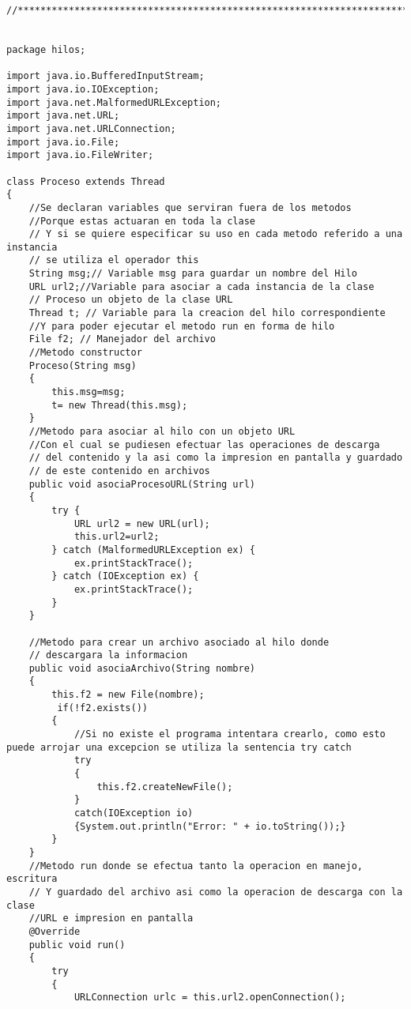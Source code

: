 \documentclass[12pt]{article} %
\begin{document}
\begin{lstlisting}
//*********************************************************************************************************//


package hilos;

import java.io.BufferedInputStream; 
import java.io.IOException;
import java.net.MalformedURLException;
import java.net.URL;
import java.net.URLConnection;
import java.io.File;
import java.io.FileWriter;

class Proceso extends Thread 
{
    //Se declaran variables que serviran fuera de los metodos
    //Porque estas actuaran en toda la clase 
    // Y si se quiere especificar su uso en cada metodo referido a una instancia
    // se utiliza el operador this
    String msg;// Variable msg para guardar un nombre del Hilo
    URL url2;//Variable para asociar a cada instancia de la clase
    // Proceso un objeto de la clase URL
    Thread t; // Variable para la creacion del hilo correspondiente
    //Y para poder ejecutar el metodo run en forma de hilo
    File f2; // Manejador del archivo
    //Metodo constructor
    Proceso(String msg)
    {
        this.msg=msg;
        t= new Thread(this.msg);
    }
    //Metodo para asociar al hilo con un objeto URL
    //Con el cual se pudiesen efectuar las operaciones de descarga
    // del contenido y la asi como la impresion en pantalla y guardado
    // de este contenido en archivos
    public void asociaProcesoURL(String url)
    {
        try {
            URL url2 = new URL(url);
            this.url2=url2;
        } catch (MalformedURLException ex) {
            ex.printStackTrace();
        } catch (IOException ex) {
            ex.printStackTrace();
        }
    }
    
    //Metodo para crear un archivo asociado al hilo donde 
    // descargara la informacion
    public void asociaArchivo(String nombre)
    {
        this.f2 = new File(nombre);
         if(!f2.exists())
        {
            //Si no existe el programa intentara crearlo, como esto puede arrojar una excepcion se utiliza la sentencia try catch
            try
            {
                this.f2.createNewFile();
            }
            catch(IOException io)
            {System.out.println("Error: " + io.toString());}   
        }
    }
    //Metodo run donde se efectua tanto la operacion en manejo, escritura
    // Y guardado del archivo asi como la operacion de descarga con la clase 
    //URL e impresion en pantalla
    @Override
    public void run()
    {
        try
        {
            URLConnection urlc = this.url2.openConnection();
 

\end{lstlisting}
\end{document}
